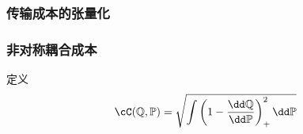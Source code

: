 \subsubsection{传输成本的张量化}


\subsubsection{非对称耦合成本}

定义
\begin{align*}
	\cC(\mathbb{Q}, \mathbb{P})
	= \sqrt{\int\left(1 - \frac{\dd \mathbb{Q}}{\dd \mathbb{P}} \right)_+^2 \dd \mathbb{P}}
\end{align*}




















